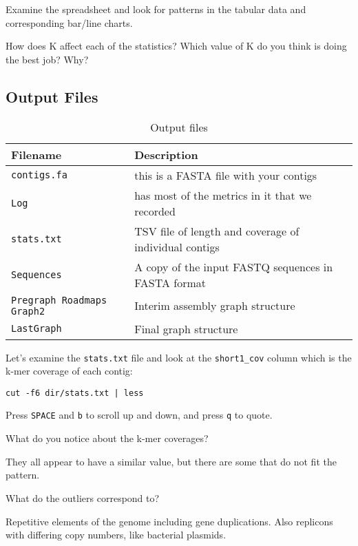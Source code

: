 Examine the spreadsheet and look for patterns in the tabular data and corresponding bar/line charts.

How does K affect each of the statistics?
Which value of K do you think is doing the best job? Why?

\subsection{Output Files}

\begin{table}[H]
  \centering
  \caption{Output files}
    \begin{tabular}{ll}
    \toprule
    \textbf{Filename} & \textbf{Description} \\
    \midrule
    \texttt{contigs.fa} & this is a FASTA file with your contigs \\
    \texttt{Log} & has most of the metrics in it that we recorded \\
	  \texttt{stats.txt} & TSV file of length and coverage of individual contigs \\
	  \texttt{Sequences} & A copy of the input FASTQ sequences in FASTA format \\
	  \texttt{Pregraph Roadmaps Graph2} & Interim assembly graph structure \\
	  \texttt{LastGraph} & Final graph structure \\
    \bottomrule
    \end{tabular}
  \label{tab:velvet_out}
\end{table}

\begin{steps}

Let's examine the \texttt{stats.txt} file and look at the \texttt{short1\_cov}
column which is the k-mer coverage of each contig:
\begin{lstlisting}
cut -f6 dir/stats.txt | less
\end{lstlisting}
Press \texttt{SPACE} and \texttt{b} to scroll up and down, and press \texttt{q} to quote.
\end{steps}

\begin{questions}
What do you notice about the k-mer coverages? \\
\begin{answer}
They all appear to have a similar value, but there are some that
do not fit the pattern.
\end{answer}
What do the outliers correspond to? \\
\begin{answer}
Repetitive elements of the genome including gene duplications.
Also replicons with differing copy numbers, like bacterial plasmids.
\end{answer}
\end{questions}

